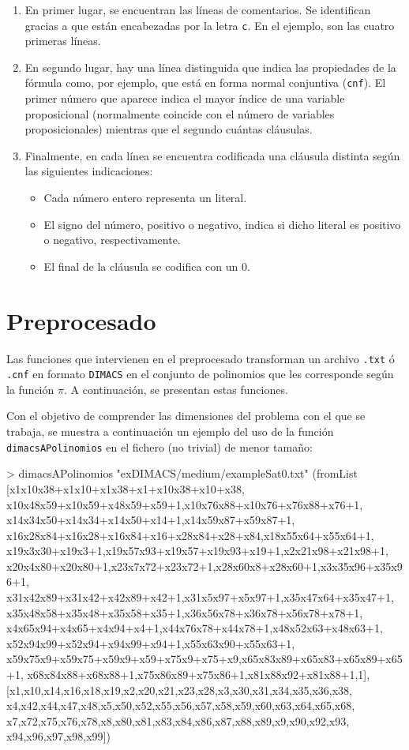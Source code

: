 \begin{enumerate}
\item En primer lugar, se encuentran las líneas de comentarios. Se identifican gracias a que están encabezadas por la letra \texttt{c}. En el ejemplo, son las cuatro primeras líneas.
\item En segundo lugar, hay una línea distinguida que indica las propiedades de la fórmula como, por ejemplo, que está en forma normal conjuntiva (\texttt{cnf}). El primer número que aparece indica el mayor índice de una variable proposicional (normalmente coincide con el número de variables proposicionales) mientras que el segundo cuántas cláusulas. 
\item Finalmente, en cada línea se encuentra codificada una cláusula distinta según las siguientes indicaciones:
\begin{itemize}
\item Cada número entero representa un literal.
\item El signo del número, positivo o negativo, indica si dicho literal es positivo o negativo, respectivamente.
\item El final de la cláusula se codifica con un 0.
\end{itemize} 
\end{enumerate}

\section{Preprocesado}

Las funciones que intervienen en el preprocesado transforman un archivo \texttt{.txt} ó \texttt{.cnf} en formato \texttt{DIMACS} en el conjunto de polinomios que les corresponde según la función $\pi$. A continuación, se presentan estas funciones.


Con el objetivo de comprender las dimensiones del problema con el que se trabaja, se muestra a continuación un ejemplo del uso de la función \texttt{dimacsAPolinomios} en el fichero (no trivial) de menor tamaño:

\begin{code}
> dimacsAPolinomios "exDIMACS/medium/exampleSat0.txt"
(fromList [x1x10x38+x1x10+x1x38+x1+x10x38+x10+x38,
x10x48x59+x10x59+x48x59+x59+1,x10x76x88+x10x76+x76x88+x76+1,
x14x34x50+x14x34+x14x50+x14+1,x14x59x87+x59x87+1,
x16x28x84+x16x28+x16x84+x16+x28x84+x28+x84,x18x55x64+x55x64+1,
x19x3x30+x19x3+1,x19x57x93+x19x57+x19x93+x19+1,x2x21x98+x21x98+1,
x20x4x80+x20x80+1,x23x7x72+x23x72+1,x28x60x8+x28x60+1,x3x35x96+x35x96+1,
x31x42x89+x31x42+x42x89+x42+1,x31x5x97+x5x97+1,x35x47x64+x35x47+1,
x35x48x58+x35x48+x35x58+x35+1,x36x56x78+x36x78+x56x78+x78+1,
x4x65x94+x4x65+x4x94+x4+1,x44x76x78+x44x78+1,x48x52x63+x48x63+1,
x52x94x99+x52x94+x94x99+x94+1,x55x63x90+x55x63+1,
x59x75x9+x59x75+x59x9+x59+x75x9+x75+x9,x65x83x89+x65x83+x65x89+x65+1,
x68x84x88+x68x88+1,x75x86x89+x75x86+1,x81x88x92+x81x88+1,1],
[x1,x10,x14,x16,x18,x19,x2,x20,x21,x23,x28,x3,x30,x31,x34,x35,x36,x38,
x4,x42,x44,x47,x48,x5,x50,x52,x55,x56,x57,x58,x59,x60,x63,x64,x65,x68,
x7,x72,x75,x76,x78,x8,x80,x81,x83,x84,x86,x87,x88,x89,x9,x90,x92,x93,
x94,x96,x97,x98,x99])
\end{code}

